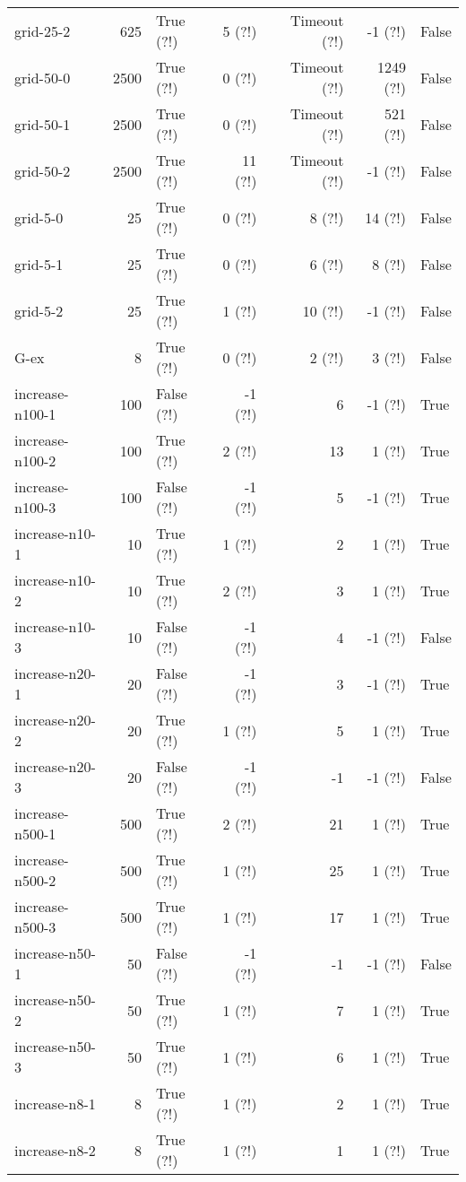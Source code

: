 \begin{longtable}{lrlrrrl}
grid-25-2 & 625 & True (?!) & 5 (?!) & Timeout (?!) & -1 (?!) & False \\
grid-50-0 & 2500 & True (?!) & 0 (?!) & Timeout (?!) & 1249 (?!) & False \\
grid-50-1 & 2500 & True (?!) & 0 (?!) & Timeout (?!) & 521 (?!) & False \\
grid-50-2 & 2500 & True (?!) & 11 (?!) & Timeout (?!) & -1 (?!) & False \\
grid-5-0 & 25 & True (?!) & 0 (?!) & 8 (?!) & 14 (?!) & False \\
grid-5-1 & 25 & True (?!) & 0 (?!) & 6 (?!) & 8 (?!) & False \\
grid-5-2 & 25 & True (?!) & 1 (?!) & 10 (?!) & -1 (?!) & False \\
G-ex & 8 & True (?!) & 0 (?!) & 2 (?!) & 3 (?!) & False \\
increase-n100-1 & 100 & False (?!) & -1 (?!) & 6 & -1 (?!) & True \\
increase-n100-2 & 100 & True (?!) & 2 (?!) & 13 & 1 (?!) & True \\
increase-n100-3 & 100 & False (?!) & -1 (?!) & 5 & -1 (?!) & True \\
increase-n10-1 & 10 & True (?!) & 1 (?!) & 2 & 1 (?!) & True \\
increase-n10-2 & 10 & True (?!) & 2 (?!) & 3 & 1 (?!) & True \\
increase-n10-3 & 10 & False (?!) & -1 (?!) & 4 & -1 (?!) & False \\
increase-n20-1 & 20 & False (?!) & -1 (?!) & 3 & -1 (?!) & True \\
increase-n20-2 & 20 & True (?!) & 1 (?!) & 5 & 1 (?!) & True \\
increase-n20-3 & 20 & False (?!) & -1 (?!) & -1 & -1 (?!) & False \\
increase-n500-1 & 500 & True (?!) & 2 (?!) & 21 & 1 (?!) & True \\
increase-n500-2 & 500 & True (?!) & 1 (?!) & 25 & 1 (?!) & True \\
increase-n500-3 & 500 & True (?!) & 1 (?!) & 17 & 1 (?!) & True \\
increase-n50-1 & 50 & False (?!) & -1 (?!) & -1 & -1 (?!) & False \\
increase-n50-2 & 50 & True (?!) & 1 (?!) & 7 & 1 (?!) & True \\
increase-n50-3 & 50 & True (?!) & 1 (?!) & 6 & 1 (?!) & True \\
increase-n8-1 & 8 & True (?!) & 1 (?!) & 2 & 1 (?!) & True \\
increase-n8-2 & 8 & True (?!) & 1 (?!) & 1 & 1 (?!) & True \\

\end{longtable}
